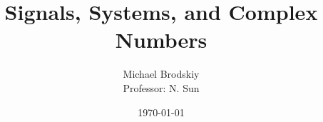 


\title{Signals, Systems, and Complex Numbers}
\date{\today}
\author{Michael Brodskiy\\ \small Professor: N. Sun}



\maketitle

